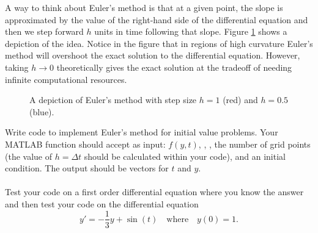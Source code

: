 A way to think about Euler's method is that at a given point, the slope is approximated by
the value of the right-hand side of the differential equation and then we step forward $h$
units in time following that slope.  Figure \ref{fig:Euler} shows a depiction of the idea.
Notice in the figure that in regions of high curvature Euler's method will overshoot the
exact solution to the differential equation.  However, taking $h \to 0$ theoretically
gives the exact solution at the tradeoff of needing infinite computational resources.

\begin{figure}[ht!]
    \begin{center}
    \end{center}
    \caption{A depiction of Euler's method with step size $h=1$ (red) and $h=0.5$ (blue).}
    \label{fig:Euler}
\end{figure}


\begin{problem}
    Write code to implement Euler's method for initial value problems.  Your MATLAB
    function should accept as input: $f(y,t)$, , , the number of
    grid points (the value of $h = \Delta t$ should be calculated within your code), and
    an initial condition.  The output should be vectors for $t$ and $y$.\\
     \\
    Test your code on a first order differential equation where you know the answer and
    then test your code on the differential equation
    \[ y' = -\frac{1}{3}y+\sin(t) \quad \text{where} \quad y(0) = 1. \]
\end{problem}


